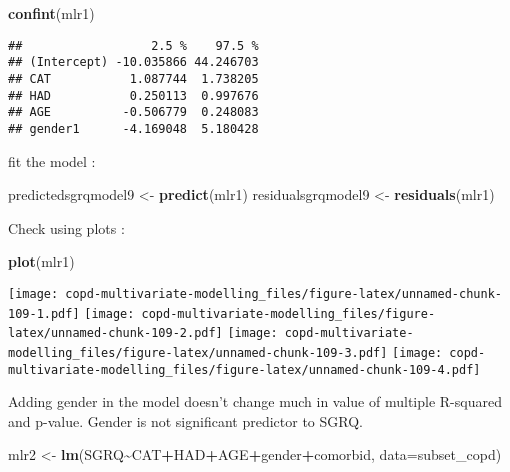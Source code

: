 \documentclass[
]{article}
\newenvironment{Shaded}{\begin{snugshade}}{\end{snugshade}}
\newcommand{\AttributeTok}[1]{\textcolor[rgb]{0.13,0.29,0.53}{#1}}
\newcommand{\FunctionTok}[1]{\textcolor[rgb]{0.13,0.29,0.53}{\textbf{#1}}}
\newcommand{\NormalTok}[1]{#1}
\newcommand{\OtherTok}[1]{\textcolor[rgb]{0.56,0.35,0.01}{#1}}
\newcommand{\SpecialCharTok}[1]{\textcolor[rgb]{0.81,0.36,0.00}{\textbf{#1}}}
\begin{document}
\begin{Shaded}
\begin{Highlighting}[]
\FunctionTok{confint}\NormalTok{(mlr1)}
\end{Highlighting}
\end{Shaded}

\begin{verbatim}
##                  2.5 %    97.5 %
## (Intercept) -10.035866 44.246703
## CAT           1.087744  1.738205
## HAD           0.250113  0.997676
## AGE          -0.506779  0.248083
## gender1      -4.169048  5.180428
\end{verbatim}

fit the model :

\begin{Shaded}
\begin{Highlighting}[]
\NormalTok{predictedsgrqmodel9 }\OtherTok{\textless{}{-}} \FunctionTok{predict}\NormalTok{(mlr1)}
\NormalTok{residualsgrqmodel9 }\OtherTok{\textless{}{-}} \FunctionTok{residuals}\NormalTok{(mlr1)}
\end{Highlighting}
\end{Shaded}

Check using plots :

\begin{Shaded}
\begin{Highlighting}[]
\FunctionTok{plot}\NormalTok{(mlr1)}
\end{Highlighting}
\end{Shaded}

\texttt{[image: copd-multivariate-modelling\_files/figure-latex/unnamed-chunk-109-1.pdf]}
\texttt{[image: copd-multivariate-modelling\_files/figure-latex/unnamed-chunk-109-2.pdf]}
\texttt{[image: copd-multivariate-modelling\_files/figure-latex/unnamed-chunk-109-3.pdf]}
\texttt{[image: copd-multivariate-modelling\_files/figure-latex/unnamed-chunk-109-4.pdf]}

Adding gender in the model doesn't change much in value of multiple
R-squared and p-value. Gender is not significant predictor to SGRQ.

\begin{Shaded}
\begin{Highlighting}[]
\NormalTok{mlr2 }\OtherTok{\textless{}{-}} \FunctionTok{lm}\NormalTok{(SGRQ}\SpecialCharTok{\textasciitilde{}}\NormalTok{CAT}\SpecialCharTok{+}\NormalTok{HAD}\SpecialCharTok{+}\NormalTok{AGE}\SpecialCharTok{+}\NormalTok{gender}\SpecialCharTok{+}\NormalTok{comorbid, }\AttributeTok{data=}\NormalTok{subset\_copd)}
\end{Highlighting}
\end{Shaded}
\end{document}
